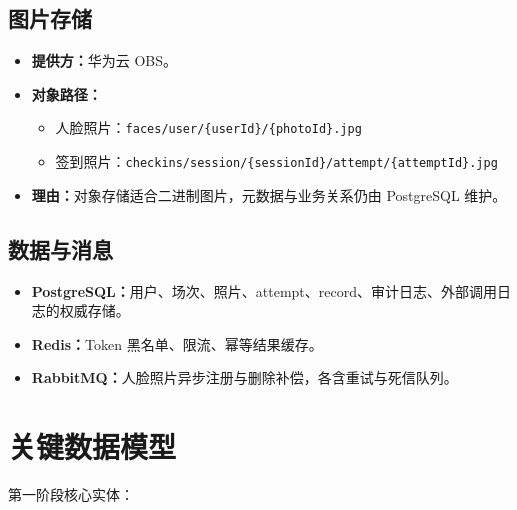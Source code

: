 \documentclass[11pt,a4paper]{ctexart}
\begin{document}
\subsection{图片存储}
\begin{itemize}[leftmargin=2.5em]
  \item \textbf{提供方：}华为云 OBS。
  \item \textbf{对象路径：}
  \begin{itemize}
    \item 人脸照片：\texttt{faces/user/\{userId\}/\{photoId\}.jpg}
    \item 签到照片：\texttt{checkins/session/\{sessionId\}/attempt/\{attemptId\}.jpg}
  \end{itemize}
  \item \textbf{理由：}对象存储适合二进制图片，元数据与业务关系仍由 PostgreSQL 维护。
\end{itemize}

\subsection{数据与消息}
\begin{itemize}[leftmargin=2.5em]
  \item \textbf{PostgreSQL：}用户、场次、照片、attempt、record、审计日志、外部调用日志的权威存储。
  \item \textbf{Redis：}Token 黑名单、限流、幂等结果缓存。
  \item \textbf{RabbitMQ：}人脸照片异步注册与删除补偿，各含重试与死信队列。
\end{itemize}

\section{关键数据模型}

第一阶段核心实体：
\end{document}
